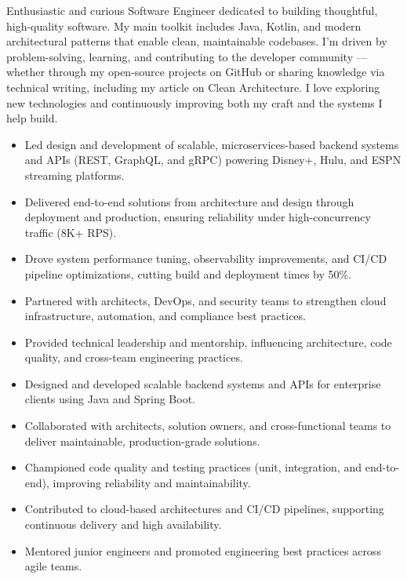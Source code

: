 \documentclass[10pt,a4paper,withhyper]{altacv}
\begin{document}
\begin{paracol}{2}


{\small 

Enthusiastic and curious Software Engineer dedicated to building thoughtful, high-quality software. My main toolkit includes Java, Kotlin, and modern architectural patterns that enable clean, maintainable codebases. I’m driven by problem-solving, learning, and contributing to the developer community — whether through my open-source projects on GitHub or sharing knowledge via technical writing, including my article on Clean Architecture. I love exploring new technologies and continuously improving both my craft and the systems I help build.

}


\begin{itemize}
\item Led design and development of scalable, microservices-based backend systems and APIs (REST, GraphQL, and gRPC) powering Disney+, Hulu, and ESPN streaming platforms.
\item Delivered end-to-end solutions from architecture and design through deployment and production, ensuring reliability under high-concurrency traffic (8K+ RPS).
\item Drove system performance tuning, observability improvements, and CI/CD pipeline optimizations, cutting build and deployment times by 50\%.
\item Partnered with architects, DevOps, and security teams to strengthen cloud infrastructure, automation, and compliance best practices.
\item Provided technical leadership and mentorship, influencing architecture, code quality, and cross-team engineering practices.
\end{itemize}

\divider

\begin{itemize}
\item Designed and developed scalable backend systems and APIs for enterprise clients using Java and Spring Boot.
\item Collaborated with architects, solution owners, and cross-functional teams to deliver maintainable, production-grade solutions.
\item Championed code quality and testing practices (unit, integration, and end-to-end), improving reliability and maintainability.
\item Contributed to cloud-based architectures and CI/CD pipelines, supporting continuous delivery and high availability.
\item Mentored junior engineers and promoted engineering best practices across agile teams.
\end{itemize}


\end{paracol}
\end{document}
